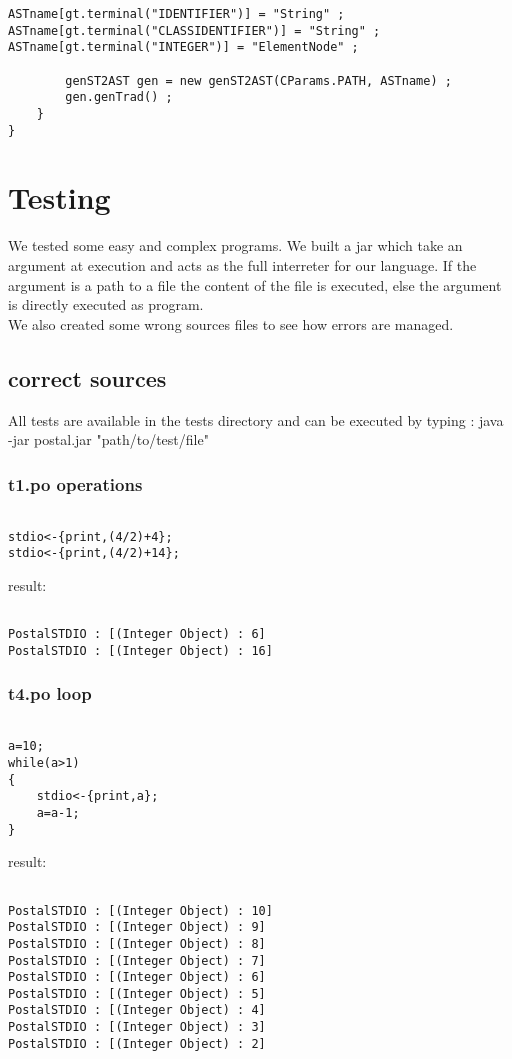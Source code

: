 \documentclass{eplDoc}
\begin{document}
\begin{lstlisting}
ASTname[gt.terminal("IDENTIFIER")] = "String" ;
ASTname[gt.terminal("CLASSIDENTIFIER")] = "String" ;
ASTname[gt.terminal("INTEGER")] = "ElementNode" ;
		
		genST2AST gen = new genST2AST(CParams.PATH, ASTname) ;
		gen.genTrad() ;
	}
}
\end{lstlisting}


\section{Testing}
We tested some easy and complex programs.  We built a jar which take an argument at execution and acts as the full interreter for our language.  If the argument is a path to a file the content of the file is executed, else the argument is directly executed as program.\\
We also created some wrong sources files to see how errors are managed.
\subsection{correct sources}
All tests are available in the tests directory and can be executed by typing : java -jar postal.jar "path/to/test/file"
\subsubsection{t1.po operations}
\begin{lstlisting}
    
stdio<-{print,(4/2)+4};
stdio<-{print,(4/2)+14};
\end{lstlisting}
result:
\begin{lstlisting}
    
PostalSTDIO : [(Integer Object) : 6]
PostalSTDIO : [(Integer Object) : 16]
\end{lstlisting}

\subsubsection{t4.po loop}
\begin{lstlisting}
    
a=10;
while(a>1)
{
    stdio<-{print,a};
    a=a-1;
}
\end{lstlisting}
result:
\begin{lstlisting}
    
PostalSTDIO : [(Integer Object) : 10]
PostalSTDIO : [(Integer Object) : 9]
PostalSTDIO : [(Integer Object) : 8]
PostalSTDIO : [(Integer Object) : 7]
PostalSTDIO : [(Integer Object) : 6]
PostalSTDIO : [(Integer Object) : 5]
PostalSTDIO : [(Integer Object) : 4]
PostalSTDIO : [(Integer Object) : 3]
PostalSTDIO : [(Integer Object) : 2]
\end{lstlisting}
\end{document}
